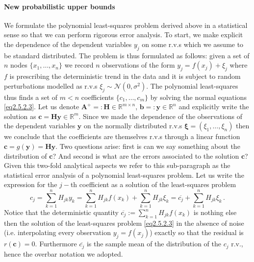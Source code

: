 \documentclass[../main.tex]{subfiles}
\begin{document}
\paragraph{New probabilistic upper bounds}\label{par:new_bounds}
We formulate the polynomial least-squares problem derived above in a statistical sense so that we can perform rigorous error analysis.
To start, we make explicit the dependence of the dependent variables $y_{j}$ on some r.v.s which we assume to be standard distributed.
The problem is thus formulated as follows: given a set of $n$ nodes $\{x_{1},\dots,x_{n}\}$ we record $n$ observations of the form $y_{j} = f(x_{j}) + \xi_{j}$ where $f$ is prescribing the deterministic trend in the data and it is subject to random perturbations modelled as r.v.s $\xi_{j}\sim \mathcal{N}(0,\sigma^2)$.
The polynomial least-squares thus finds a set of $m<n$ coefficients $\{c_{1},\dots,c_{m}\}$ by solving the normal equations \eqref{eq2.5.2.3}.
Let us denote $\boldsymbol{A}^{+}=:\boldsymbol{H}\in \mathbb{R}^{m\times n}$, $\boldsymbol{b}=:\boldsymbol{y}\in \mathbb{R}^{n}$ and explicitly write the solution as $\boldsymbol{c} = \boldsymbol{Hy}\in \mathbb{R}^{m}$.
Since we made the dependence of the observations of the dependent variables $\boldsymbol{y}$ on the normally distributed r.v.s $\boldsymbol{\xi}=(\xi_{1},\dots,\xi_{n})$ then we conclude that the coefficients are themselves r.v.s through a linear function $\boldsymbol{c} = g(\boldsymbol{y}) = \boldsymbol{Hy}$.
Two questions arise: first is can we say something about the distribution of $\boldsymbol{c}$? And second is what are the errors associated to the solution $\boldsymbol{c}$?
Given this two-fold analytical aspects we refer to this sub-paragraph as the statistical error analysis of a polynomial least-squares problem.
Let us write the expression for the $j-$th coefficient as a solution of the least-squares problem
\begin{equation}\label{eq2.5.2.4}
        c_{j} = \sum_{k=1}^{n}H_{jk}y_{k} = \sum_{k=1}^{n}H_{jk}f(x_{k}) + \sum_{k=1}^{n}H_{jk}\xi_{k} = \overline{c_{j}} + \sum_{k=1}^{n}H_{jk}\xi_{k}\,.
\end{equation}
Notice that the deterministic quantity $\overline{c_{j}} := \sum_{k=1}^{n}H_{jk}f(x_{k})$ is nothing else then the solution of the least-squares problem \eqref{eq2.5.2.3} in the absence of noise (i.e. interpolating every observation $y_{j} = f(x_{j})$) exactly so that the residual is $r(\boldsymbol{c}) = 0$.
Furthermore $\overline{c_{j}}$ is the sample mean of the distribution of the $c_{j}$ r.v., hence the overbar notation we adopted.
\end{document}
